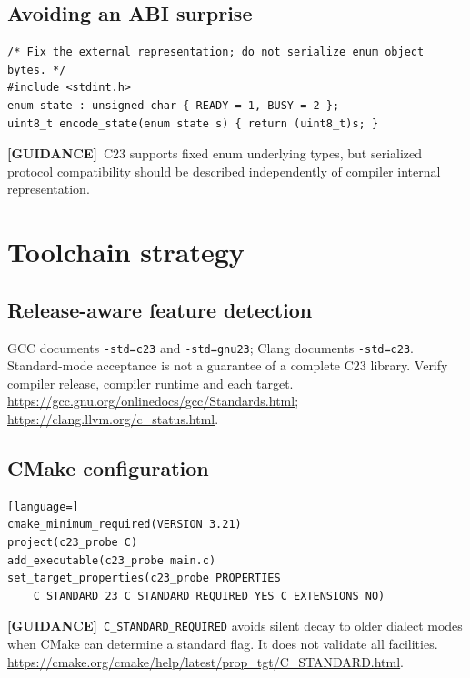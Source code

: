 \documentclass[10pt,letterpaper,oneside]{report}
\newcommand{\guidance}{\textbf{[GUIDANCE]}}
\begin{document}
\section{Avoiding an ABI surprise}
\begin{lstlisting}
/* Fix the external representation; do not serialize enum object bytes. */
#include <stdint.h>
enum state : unsigned char { READY = 1, BUSY = 2 };
uint8_t encode_state(enum state s) { return (uint8_t)s; }
\end{lstlisting}
\guidance\ C23 supports fixed enum underlying types, but serialized protocol compatibility should be described independently of compiler internal representation.
\chapter{Toolchain strategy}
\section{Release-aware feature detection}
GCC documents \texttt{-std=c23} and \texttt{-std=gnu23}; Clang documents \texttt{-std=c23}. Standard-mode acceptance is not a guarantee of a complete C23 library. Verify compiler release, compiler runtime and each target. \url{https://gcc.gnu.org/onlinedocs/gcc/Standards.html}; \url{https://clang.llvm.org/c_status.html}.
\section{CMake configuration}
\begin{lstlisting}[language=]
cmake_minimum_required(VERSION 3.21)
project(c23_probe C)
add_executable(c23_probe main.c)
set_target_properties(c23_probe PROPERTIES
    C_STANDARD 23 C_STANDARD_REQUIRED YES C_EXTENSIONS NO)
\end{lstlisting}
\guidance\ \texttt{C\_STANDARD\_REQUIRED} avoids silent decay to older dialect modes when CMake can determine a standard flag. It does not validate all facilities. \url{https://cmake.org/cmake/help/latest/prop_tgt/C_STANDARD.html}.
\end{document}

